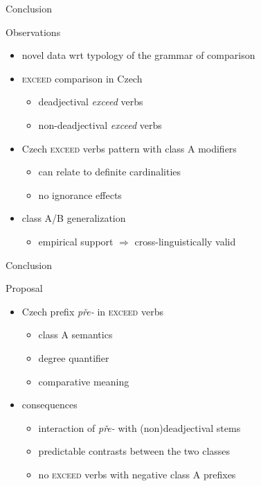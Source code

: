 \documentclass[12pt]{beamer}
\begin{document}
	\begin{frame}{Conclusion}
		
		Observations

		\begin{itemize}
			\item novel data wrt typology of the grammar of comparison
            \item \textsc{exceed} comparison in Czech
			\begin{itemize}
				\item deadjectival \textit{exceed} verbs
				\item non-deadjectival \textit{exceed} verbs
			\end{itemize}
			\item Czech \textsc{exceed} verbs pattern with class A modifiers
			\begin{itemize}
				\item can relate to definite cardinalities
				\item no ignorance effects
			\end{itemize}
			\item class A/B generalization  
\begin{itemize}
\item empirical support $\Rightarrow$ cross-linguistically valid
\end{itemize}
		\end{itemize}
		
	\end{frame}
	
	\begin{frame}{Conclusion}
		
		Proposal
		
		\begin{itemize}
			\item Czech prefix \textit{pře-} in \textsc{exceed} verbs    
			\begin{itemize}
				\item class A semantics
\item degree quantifier
\item comparative meaning 
			\end{itemize}
            \item consequences
\begin{itemize}
\item interaction of \textit{pře-} with (non)deadjectival stems 
\item predictable contrasts between the two classes
\item no \textsc{exceed} verbs with negative class A prefixes
\end{itemize}
		\end{itemize}
		
	\end{frame}
	
\end{document}
